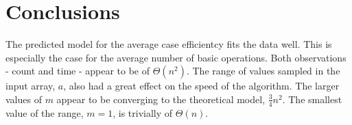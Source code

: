 \documentclass{article}
\begin{document}
\pagebreak

\section{Conclusions}
The predicted model for the average case efficientcy fits the data well. This is especially the case for the average number of basic operations. Both observations - count and time - appear to be of $\Theta(n^2)$. The range of values sampled in the input array, $a$, also had a great effect on the speed of the algorithm. The larger values of $m$ appear to be converging to the theoretical model, $\frac{3}{4}n^2$. The smallest value of the range, $m=1$, is trivially of $\Theta(n)$. 
\end{document}
